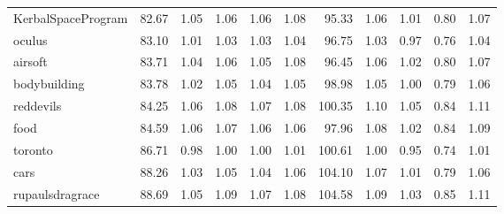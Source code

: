 \begin{tabular}{lrrrrrrrrrr}
KerbalSpaceProgram  &          82.67 &                1.05 &                1.06 &                1.06 &                1.08 &                 95.33 &                       1.06 &                       1.01 &                       0.80 &                       1.07 \\
oculus              &          83.10 &                1.01 &                1.03 &                1.03 &                1.04 &                 96.75 &                       1.03 &                       0.97 &                       0.76 &                       1.04 \\
airsoft             &          83.71 &                1.04 &                1.06 &                1.05 &                1.08 &                 96.45 &                       1.06 &                       1.02 &                       0.80 &                       1.07 \\
bodybuilding        &          83.78 &                1.02 &                1.05 &                1.04 &                1.05 &                 98.98 &                       1.05 &                       1.00 &                       0.79 &                       1.06 \\
reddevils           &          84.25 &                1.06 &                1.08 &                1.07 &                1.08 &                100.35 &                       1.10 &                       1.05 &                       0.84 &                       1.11 \\
food                &          84.59 &                1.06 &                1.07 &                1.06 &                1.06 &                 97.96 &                       1.08 &                       1.02 &                       0.84 &                       1.09 \\
toronto             &          86.71 &                0.98 &                1.00 &                1.00 &                1.01 &                100.61 &                       1.00 &                       0.95 &                       0.74 &                       1.01 \\
cars                &          88.26 &                1.03 &                1.05 &                1.04 &                1.06 &                104.10 &                       1.07 &                       1.01 &                       0.79 &                       1.06 \\
rupaulsdragrace     &          88.69 &                1.05 &                1.09 &                1.07 &                1.08 &                104.58 &                       1.09 &                       1.03 &                       0.85 &                       1.11 \\

\end{tabular}
